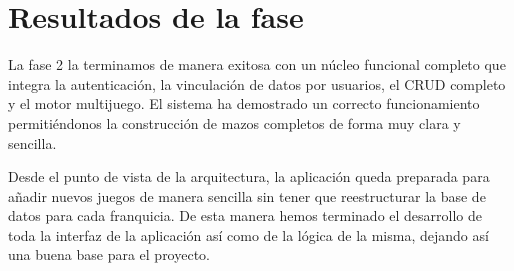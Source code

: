 \section{Resultados de la fase}

La fase 2 la terminamos de manera exitosa con un núcleo funcional completo que integra la autenticación, la vinculación de datos por usuarios, el CRUD completo y el motor multijuego. El sistema ha demostrado un correcto funcionamiento permitiéndonos la construcción de mazos completos de forma muy clara y sencilla.

Desde el punto de vista de la arquitectura, la aplicación queda preparada para añadir nuevos juegos de manera sencilla sin tener que reestructurar la base de datos para cada franquicia. 
De esta manera hemos terminado el desarrollo de toda la interfaz de la aplicación así como de la lógica de la misma, dejando así una buena base para el proyecto.
